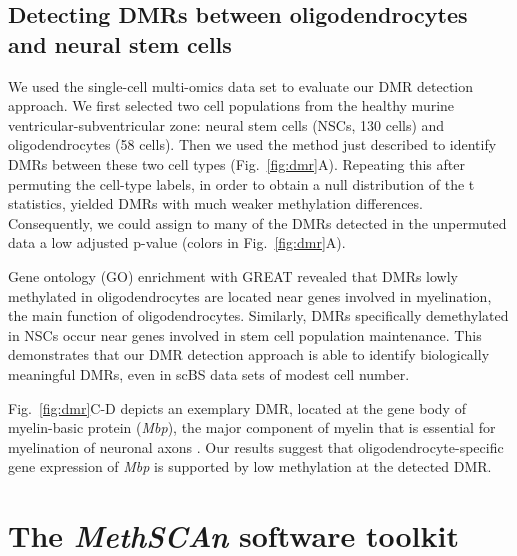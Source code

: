 \documentclass[twocolumn,10pt]{article}
\begin{document}
\subsection{Detecting DMRs between oligodendrocytes and neural stem cells}


We used the single-cell multi-omics data set \citep{kremer_scnmt} to evaluate our DMR detection approach.
We first selected two cell populations from the healthy murine ventricular-subventricular zone: neural stem cells (NSCs, 130 cells) and oligodendrocytes (58 cells).
Then we used the method just described to identify DMRs between these two cell types (Fig.~\ref{fig:dmr}A).
Repeating this after permuting the cell-type labels, in order to obtain a null distribution of the t statistics, yielded DMRs with much weaker methylation differences.
Consequently, we could assign to many of the DMRs detected in the unpermuted data a low adjusted p-value (colors in Fig.~\ref{fig:dmr}A).

Gene ontology (GO) enrichment with GREAT \citep{mclean2010great} revealed that DMRs lowly methylated in oligodendrocytes are located near genes involved in myelination, the main function of oligodendrocytes.
Similarly, DMRs specifically demethylated in NSCs occur near genes involved in stem cell population maintenance.
This demonstrates that our DMR detection approach is able to identify biologically meaningful DMRs, even in scBS data sets of modest cell number.

Fig.~\ref{fig:dmr}C-D depicts an exemplary DMR, located at the gene body of myelin-basic protein (\textit{Mbp}), the major component of myelin that is essential for myelination of neuronal axons \citep{mbp}.
Our results suggest that oligodendrocyte-specific gene expression of \textit{Mbp} is supported by low methylation at the detected DMR.


\section{The \textit{MethSCAn} software toolkit}
\end{document}
